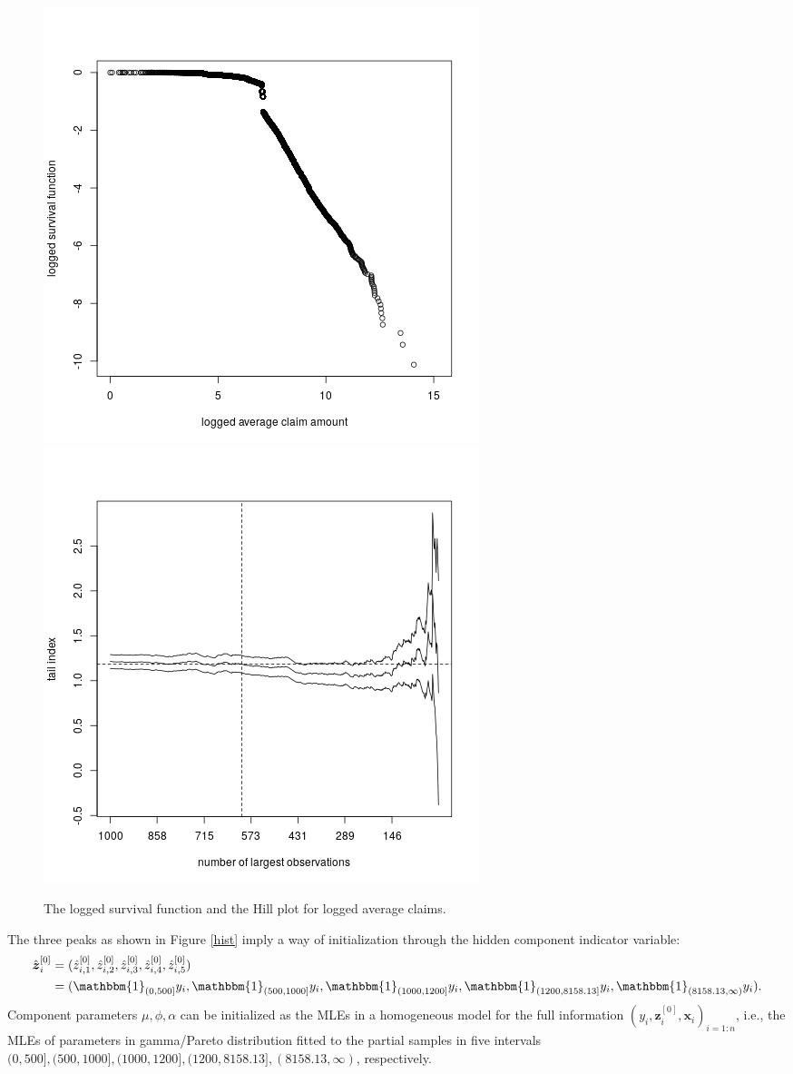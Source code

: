 \documentclass[11pt]{article}
\numberwithin{equation}{section}
\def\bx{\boldsymbol{x}}
\def\bz{\boldsymbol{z}}
\begin{document}
\begin{figure}[h!]
	\centering
	\includegraphics[width=0.4\linewidth]{../plots/sev/log-log.png}
	\includegraphics[width=0.4\linewidth]{../plots/sev/hill.png}
	\caption{The logged survival function and the Hill plot for logged average claims.}\label{tail}
\end{figure}
	
	The three peaks as shown in Figure \ref{hist} imply a way of initialization through the hidden component indicator variable:
	\begin{equation}
		\begin{aligned}
			\hat{\bz}^{[0]}_i&=(\hat{z}^{[0]}_{i,1},\hat{z}^{[0]}_{i,2},\hat{z}^{[0]}_{i,3},\hat{z}^{[0]}_{i,4},\hat{z}^{[0]}_{i,5})\\
			&=(\mathbbm{1}_{(0,500]}y_i,\mathbbm{1}_{(500, 1000]}y_i,\mathbbm{1}_{(1000,1200]}y_i,\mathbbm{1}_{(1200,8158.13]}y_i,\mathbbm{1}_{(8158.13,\infty)}y_i).
		\end{aligned}
	\end{equation}
	Component parameters $\mu,\phi,\alpha$ can be initialized as the MLEs in a homogeneous model for the full information $(y_i,\hat{\bz}_i^{[0]},\bx_i)_{i=1:n}$, i.e., the MLEs of parameters in gamma/Pareto distribution fitted to the partial samples in five intervals $(0,500], (500,1000], (1000,1200],(1200,8158.13],(8158.13,\infty)$, respectively.
	
\end{document}
